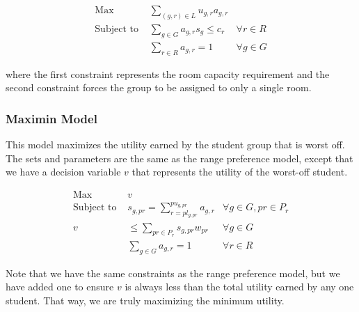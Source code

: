 \documentclass[12pt]{article}
\begin{document}
    \begin{align*}
        \text{Max} &\sum_{(g,r) \in L} u_{g,r}a_{g,r} &\\
        \text{Subject to } &\sum_{g \in G} a_{g,r}s_g \leq c_r 
        & \forall r \in R \\
        &\sum_{r \in R} a_{g,r} = 1 & \forall g \in G
    \end{align*}

    where the first constraint represents the room capacity requirement and the second constraint forces the group to be assigned to only a single room.

    \subsubsection*{Maximin Model}
    This model maximizes the utility earned by the student group that is worst off. The sets and parameters are the same as the range preference model, except that we have a decision variable $v$ that represents the utility of the worst-off student.

    \begin{align*}
    \text{Max } &v \\
    \text{Subject to } &s_{g,pr} = \sum_{r = pl_{g,pr}}^{pu_{g,pr}} a_{g,r} &\forall g \in G, pr \in P_r\\ 
    v &\leq \sum_{pr \in P_r} s_{g,pr}w_{pr} &\forall g \in G\\
    &\sum_{g \in G} a_{g,r} = 1 &\forall r \in R
    \end{align*}

    Note that we have the same constraints as the range preference model, but we have added one to ensure $v$ is always less than the total utility earned by any one student. That way, we are truly maximizing the minimum utility. 
\end{document}

